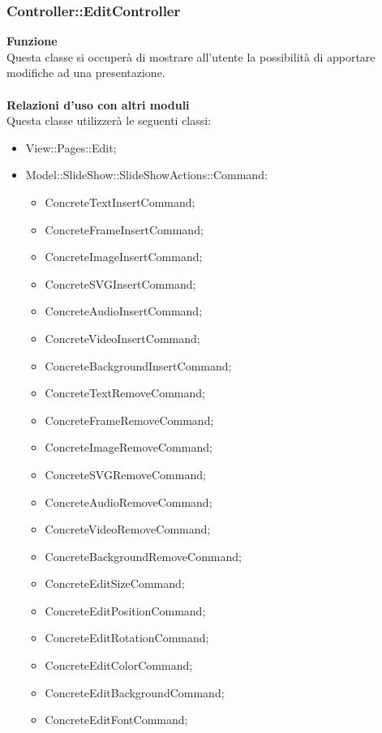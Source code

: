 {				\subsubsection{Controller::EditController}{
					\textbf{Funzione}\\
					\indent Questa classe si occuperà di mostrare all'utente la possibilità di apportare modifiche ad una presentazione.\\\\
					\textbf{Relazioni d'uso con altri moduli}\\
					\indent Questa classe utilizzerà le seguenti classi:
					\begin{itemize}
						\item View::Pages::Edit;
						\item Model::SlideShow::SlideShowActions::Command:
						\begin{itemize}
													\item ConcreteTextInsertCommand;
													\item ConcreteFrameInsertCommand;
													\item ConcreteImageInsertCommand;
													\item ConcreteSVGInsertCommand;
													\item ConcreteAudioInsertCommand;
													\item ConcreteVideoInsertCommand;
													\item ConcreteBackgroundInsertCommand;
													\item ConcreteTextRemoveCommand;
													\item ConcreteFrameRemoveCommand;
													\item ConcreteImageRemoveCommand;
													\item ConcreteSVGRemoveCommand;
													\item ConcreteAudioRemoveCommand;
													\item ConcreteVideoRemoveCommand;
													\item ConcreteBackgroundRemoveCommand;
													\item ConcreteEditSizeCommand;
													\item ConcreteEditPositionCommand;
													\item ConcreteEditRotationCommand;
													\item ConcreteEditColorCommand;
													\item ConcreteEditBackgroundCommand;
													\item ConcreteEditFontCommand;

\end{itemize}
\end{itemize}}}
